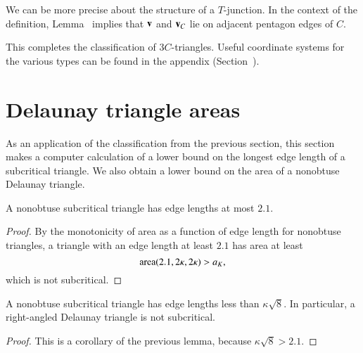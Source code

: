 We can be more precise about the structure of a $T$-junction.  In the
context of the definition, Lemma~ implies that ${\mathbf v}$
and ${\mathbf v}_C$ lie on adjacent pentagon edges of $C$.

This completes the classification of $3C$-triangles.  Useful
coordinate systems for the various types can be found in the appendix
(Section~).

\section{Delaunay triangle areas}

As an application of the classification from the previous section,
this section makes a computer calculation of a lower bound on the
longest edge length of a subcritical triangle.  We also obtain a lower
bound on the area of a nonobtuse Delaunay triangle.



\begin{lemma} A nonobtuse subcritical triangle has edge lengths
  at most $2.1$.
\end{lemma}

\begin{proof} By the monotonicity of area as a function of edge length
  for nonobtuse triangles, a triangle with an edge length at least
  $2.1$ has area at least
\[
{\operatorname{area}}(2.1,2\kappa,2\kappa) > a_K,
\] %
which is not subcritical.
\end{proof}

\begin{lemma} 
  A nonobtuse subcritical triangle has edge lengths less than
  $\kappa\sqrt8$.  In particular, a right-angled Delaunay triangle is
  not subcritical.
\end{lemma}

\begin{proof}  
This is a corollary of the previous lemma, because $\kappa\sqrt8 >
2.1$.
%
\end{proof}

